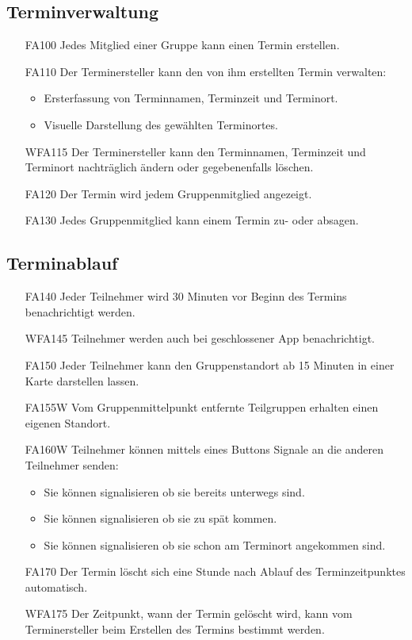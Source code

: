 \documentclass{scrartcl}
\begin{document}
	\subsection{Terminverwaltung}
	\begin{itemize}
		\item[FA100] Jedes \gls{Mitglied} einer Gruppe kann einen Termin erstellen.
		\item[FA110] Der Terminersteller kann den von ihm erstellten Termin verwalten:
		\begin{itemize}
			\item Ersterfassung von Terminnamen, Terminzeit und Terminort.
		\end{itemize}
		
		\begin{itemize}
			\item Visuelle Darstellung des gewählten Terminortes. 
		\end{itemize}
		
		
		\item[WFA115] Der Terminersteller kann den Terminnamen, Terminzeit und Terminort nachträglich ändern oder gegebenenfalls löschen.
		
		\item[FA120] Der Termin wird jedem Gruppenmitglied angezeigt.
		\item[FA130] Jedes Gruppenmitglied kann einem Termin zu- oder absagen.		
		
	\end{itemize}
	
	\subsection{Terminablauf}
	\begin{itemize}
		\item[FA140] Jeder \gls{Teilnehmer} wird 30 Minuten vor Beginn des Termins benachrichtigt werden.
		\item[WFA145] \gls{Teilnehmer} werden auch bei geschlossener App benachrichtigt.
		\item[FA150] Jeder \gls{Teilnehmer} kann den Gruppenstandort ab 15 Minuten in einer Karte darstellen lassen.
		\item[FA155W] Vom Gruppenmittelpunkt entfernte Teilgruppen  erhalten einen eigenen Standort. 
		\item[FA160W] \gls{Teilnehmer} können mittels eines Buttons Signale an die anderen Teilnehmer senden:
		\begin{itemize}
			\item Sie können signalisieren ob sie bereits unterwegs sind.
			\item Sie können signalisieren ob sie zu spät kommen.
			\item Sie können signalisieren ob sie schon am Terminort angekommen sind.
		\end{itemize}
		\item[FA170] Der Termin löscht sich eine Stunde nach Ablauf des Terminzeitpunktes automatisch.
		\item[WFA175] Der Zeitpunkt, wann der Termin gelöscht wird, kann vom Terminersteller beim Erstellen des Termins bestimmt werden.
	\end{itemize}
		
\end{document}
